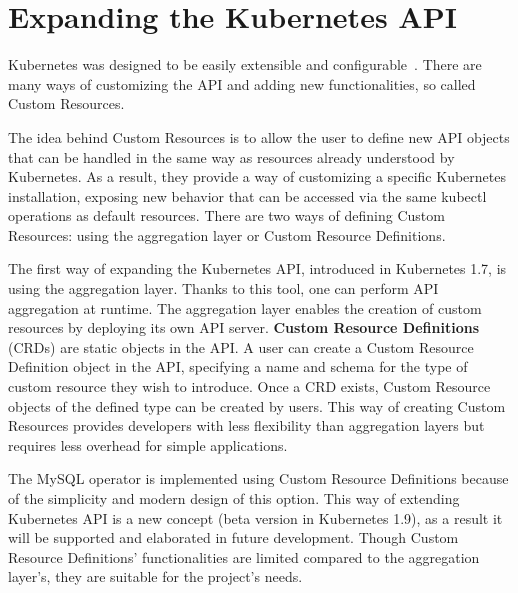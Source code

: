 \section{Expanding the Kubernetes API}
Kubernetes was designed to be easily extensible and configurable~\cite{extending-kubeapi}. There are
many ways of customizing the API and adding new functionalities, so called Custom Resources.

The idea behind Custom Resources is to allow the user to define new API objects that can be handled
in the same way as resources already understood by Kubernetes. As a result, they provide a way of
customizing a specific Kubernetes installation, exposing new behavior that can be accessed via the
same kubectl operations as default resources. There are two ways of defining Custom Resources: using
the aggregation layer or Custom Resource Definitions.

The first way of expanding the Kubernetes API, introduced in Kubernetes 1.7, is using the
aggregation layer. Thanks to this tool, one can perform API aggregation at runtime. The aggregation
layer enables the creation of custom resources by deploying its own API server.
\textbf{Custom Resource Definitions} (CRDs) are static objects in the API. A user can create a
Custom Resource Definition object in the API, specifying a name and schema for the type of custom
resource they wish to introduce. Once a CRD exists, Custom Resource objects of the defined type can
be created by users. This way of creating Custom Resources provides developers with less flexibility
than aggregation layers but requires less overhead for simple applications.

The MySQL operator is implemented using Custom Resource Definitions because of the simplicity and
modern design of this option. This way of extending Kubernetes API is a new concept (beta version in
Kubernetes 1.9), as a result it will be supported and elaborated in future development. Though
Custom Resource Definitions’ functionalities are limited compared to the aggregation layer’s, they
are suitable for the project’s needs.
